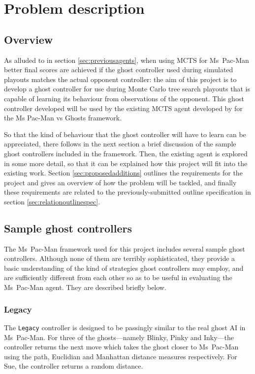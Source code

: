 \chapter{Problem description}
\label{ch:problem}

\section{Overview}

As alluded to in section \ref{sec:previousagents}, when using MCTS for Ms~Pac-Man better final scores are achieved if the ghost controller used during simulated playouts matches the actual opponent controller: the aim of this project is to develop a ghost controller for use during Monte Carlo tree search playouts that is capable of learning its behaviour from observations of the opponent.  This ghost controller developed will be used by the existing MCTS agent developed by \citet{Me2012} for the Ms Pac-Man vs Ghosts framework.

So that the kind of behaviour that the ghost controller will have to learn can be appreciated, there follows in the next section a brief discussion of the sample ghost controllers included in the framework.  Then, the existing agent is explored in some more detail, so that it can be explained how this project will fit into the existing work.  Section \ref{sec:proposedadditions} outlines the requirements for the project and gives an overview of how the problem will be tackled, and finally these requirements are related to the previously-submitted outline specification in section \ref{sec:relationoutlinespec}.


\section{Sample ghost controllers}
\label{sec:sampleghosts}

The Ms~Pac-Man framework used for this project includes several sample ghost controllers.  Although none of them are terribly sophisticated, they provide a basic understanding of the kind of strategies ghost controllers may employ, and are sufficiently different from each other so as to be useful in evaluating the Ms~Pac-Man agent.  They are described briefly below.

\subsection{Legacy}
\label{sec:legacy}
The {\tt Legacy} controller is designed to be passingly similar to the real ghost AI in Ms~Pac-Man.  For three of the ghosts---namely Blinky, Pinky and Inky---the controller returns the next move which takes the ghost closer to Ms~Pac-Man using the path, Euclidian and Manhattan distance measures respectively.  For Sue, the controller returns a random distance.

